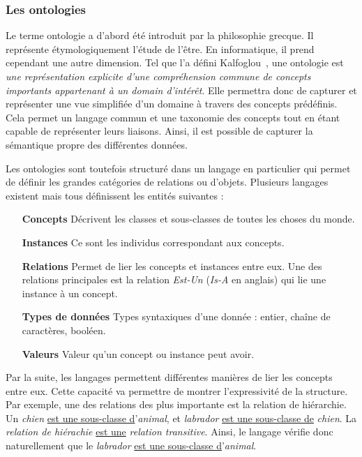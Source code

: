 \subsubsection{Les ontologies}
Le terme ontologie a d'abord été introduit par la philosophie grecque. Il représente étymologiquement l'étude de l'être. En informatique, il prend cependant une autre dimension. Tel que l'a défini Kalfoglou~\cite{Kalfoglou:ontology}, une ontologie est \textit{une représentation explicite d'une compréhension commune de concepts importants appartenant à un domain d'intérêt}.
Elle permettra donc de capturer et représenter une vue simplifiée d'un domaine à travers des concepts prédéfinis. Cela permet un langage commun et une taxonomie des concepts tout en étant capable de représenter leurs liaisons. Ainsi, il est possible de capturer la sémantique propre des différentes données.

Les ontologies sont toutefois structuré dans un langage en particulier qui permet de définir les grandes catégories de relations ou d'objets. Plusieurs langages existent mais tous définissent les entités suivantes :
\begin{itemize}
    \item[\textbf{Concepts}] Décrivent les classes et sous-classes de toutes les choses du monde.
    \item[\textbf{Instances}] Ce sont les individus correspondant aux concepts.
    \item[\textbf{Relations}] Permet de lier les concepts et instances entre eux. Une des relations principales est la relation \textit{Est-Un} (\textit{Is-A} en anglais) qui lie une instance à un concept.
    \item[\textbf{Types de données}] Types syntaxiques d'une donnée : entier, chaîne de caractères, booléen.
    \item[\textbf{Valeurs}] Valeur qu'un concept ou instance peut avoir.
\end{itemize}

Par la suite, les langages permettent différentes manières de lier les concepts entre eux. Cette capacité va permettre de montrer l'expressivité de la structure. Par exemple, une des relations des plus importante est la relation de hiérarchie. Un \textit{chien} \underline{est une sous-classe d}'\textit{animal}, et \textit{labrador} \underline{est une sous-classe de} \textit{chien}. La \textit{relation de hiérachie} \underline{est une} \textit{relation transitive}. Ainsi, le langage vérifie donc naturellement que le \textit{labrador} \underline{est une sous-classe d}'\textit{animal}. 

